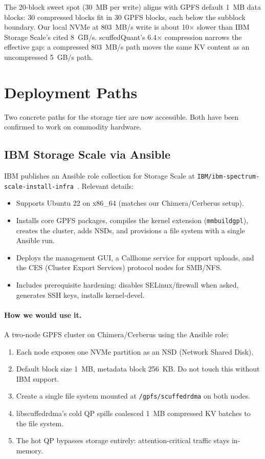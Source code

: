 \documentclass[11pt,letterpaper]{article}
\begin{document}
The 20-block sweet spot (30~MB per write) aligns with GPFS default 1~MB data blocks: 30 compressed blocks fit in 30 GPFS blocks, each below the subblock boundary. Our local NVMe at 803~MB/s write is about 10$\times$ slower than IBM Storage Scale's cited 8~GB/s. scuffedQuant's 6.4$\times$ compression narrows the effective gap: a compressed 803~MB/s path moves the same KV content as an uncompressed 5~GB/s path.

\section{Deployment Paths}

Two concrete paths for the storage tier are now accessible. Both have been confirmed to work on commodity hardware.

\subsection{IBM Storage Scale via Ansible}

IBM publishes an Ansible role collection for Storage Scale at \texttt{IBM/ibm-spectrum-scale-install-infra}~\cite{gpfs_ansible}. Relevant details:

\begin{itemize}
\item Supports Ubuntu 22 on x86\_64 (matches our Chimera/Cerberus setup).
\item Installs core GPFS packages, compiles the kernel extension (\texttt{mmbuildgpl}), creates the cluster, adds NSDs, and provisions a file system with a single Ansible run.
\item Deploys the management GUI, a Callhome service for support uploads, and the CES (Cluster Export Services) protocol nodes for SMB/NFS.
\item Includes prerequisite hardening: disables SELinux/firewall when asked, generates SSH keys, installs kernel-devel.
\end{itemize}

\paragraph{How we would use it.} A two-node GPFS cluster on Chimera/Cerberus using the Ansible role:

\begin{enumerate}
\item Each node exposes one NVMe partition as an NSD (Network Shared Disk).
\item Default block size 1~MB, metadata block 256~KB. Do not touch this without IBM support.
\item Create a single file system mounted at \texttt{/gpfs/scuffedrdma} on both nodes.
\item libscuffedrdma's cold QP spills coalesced 1~MB compressed KV batches to the file system.
\item The hot QP bypasses storage entirely: attention-critical traffic stays in-memory.
\end{enumerate}
\end{document}
